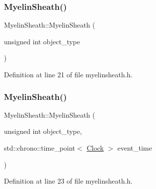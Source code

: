 \subsubsection{\texorpdfstring{Myelin\+Sheath()}{MyelinSheath()}\hspace{0.1cm}{\footnotesize\ttfamily [2/4]}}
{\footnotesize\ttfamily Myelin\+Sheath\+::\+Myelin\+Sheath (\begin{DoxyParamCaption}\item[{unsigned int}]{object\+\_\+type }\end{DoxyParamCaption})\hspace{0.3cm}{\ttfamily [inline]}}



Definition at line 21 of file myelinsheath.\+h.

\mbox{\label{class_myelin_sheath_a34a80a57ebcde58933a07ca9d99780eb}} 
\subsubsection{\texorpdfstring{Myelin\+Sheath()}{MyelinSheath()}\hspace{0.1cm}{\footnotesize\ttfamily [3/4]}}
{\footnotesize\ttfamily Myelin\+Sheath\+::\+Myelin\+Sheath (\begin{DoxyParamCaption}\item[{unsigned int}]{object\+\_\+type,  }\item[{std\+::chrono\+::time\+\_\+point$<$ \hyperlink{universe_8h_a0ef8d951d1ca5ab3cfaf7ab4c7a6fd80}{Clock} $>$}]{event\+\_\+time }\end{DoxyParamCaption})\hspace{0.3cm}{\ttfamily [inline]}}



Definition at line 23 of file myelinsheath.\+h.

\mbox{\label{class_myelin_sheath_aac107d8f22ca3c02f2d346f44950e6d0}} 
